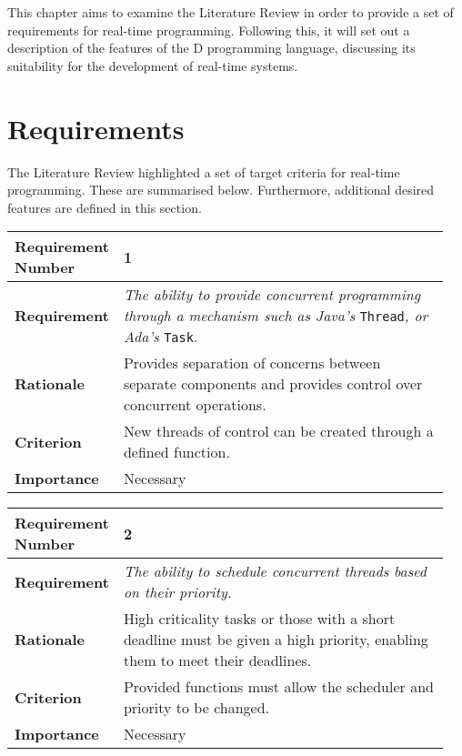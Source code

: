 
This chapter aims to examine the Literature Review in order to provide a set of 
requirements for real-time programming. Following this, it will set out a 
description of the features of the D programming language, discussing its 
suitability for the development of real-time systems.

\section{Requirements}
The Literature Review highlighted a set of target criteria for real-time 
programming. These are summarised below. Furthermore, additional desired features 
are defined in this section. 
\begin{table}[!h]
\centering
\begin{tabular}{|L{0.2\linewidth}|L{0.75\linewidth}|}
\hline
\textbf{Requirement Number} & 1 \\ \hline
\textbf{Requirement} & \emph{The ability to provide concurrent programming through a 
mechanism such as Java's} \texttt{Thread}\emph{, or Ada's} \texttt{Task}. \\ \hline
\textbf{Rationale}      & Provides separation of concerns between separate components
and provides control over concurrent operations. \\ \hline
\textbf{Criterion}      & New threads of control can be created through a defined 
function. \\ \hline
\textbf{Importance}     & Necessary \\ \hline
\end{tabular}
\end{table}
\begin{table}[!h]
\centering
\begin{tabular}{|L{0.2\linewidth}|L{0.75\linewidth}|}
\hline
\textbf{Requirement Number} & 2 \\ \hline
\textbf{Requirement} & \emph{The ability to schedule concurrent threads based on 
                their priority.}\\ \hline
\textbf{Rationale}      & High criticality tasks or those with a short deadline
                must be given a high priority, enabling them to meet their 
                deadlines. \\ \hline
\textbf{Criterion}      & Provided functions must allow the scheduler and
                priority to be changed. \\ \hline
\textbf{Importance}     & Necessary \\ \hline
\end{tabular}
\end{table}
